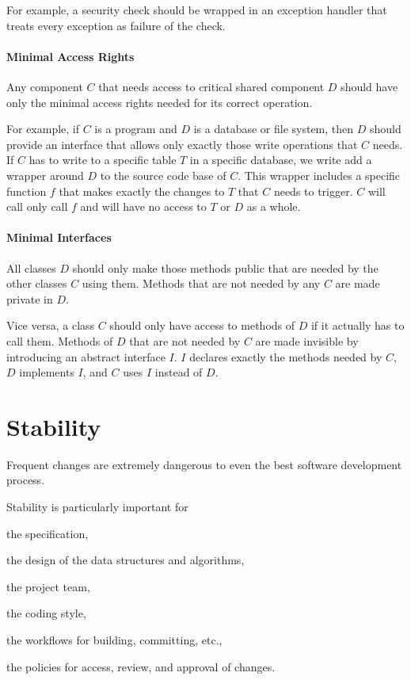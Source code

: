 For example, a security check should be wrapped in an exception handler that treats every exception as failure of the check.

\paragraph{Minimal Access Rights}
Any component $C$ that needs access to critical shared component $D$ should have only the minimal access rights needed for its correct operation.

For example, if $C$ is a program and $D$ is a database or file system, then $D$ should provide an interface that allows only exactly those write operations that $C$ needs.
If $C$ has to write to a specific table $T$ in a specific database, we write add a wrapper around $D$ to the source code base of $C$.
This wrapper includes a specific function $f$ that makes exactly the changes to $T$ that $C$ needs to trigger.
$C$ will call only call $f$ and will have no access to $T$ or $D$ as a whole.

\paragraph{Minimal Interfaces}
All classes $D$ should only make those methods public that are needed by the other classes $C$ using them.
Methods that are not needed by any $C$ are made private in $D$.

Vice versa, a class $C$ should only have access to methods of $D$ if it actually has to call them.
Methods of $D$ that are not needed by $C$ are made invisible by introducing an abstract interface $I$.
$I$ declares exactly the methods needed by $C$, $D$ implements $I$, and $C$ uses $I$ instead of $D$.

\section{Stability}

Frequent changes are extremely dangerous to even the best software development process.

Stability is particularly important for
\begin{compactitem}
  \item the specification,
  \item the design of the data structures and algorithms,
  \item the project team,
  \item the coding style,
  \item the workflows for building, committing, etc.,
  \item the policies for access, review, and approval of changes.
\end{compactitem}

